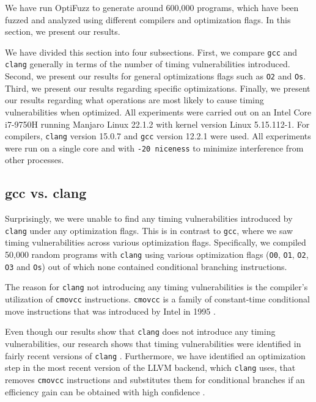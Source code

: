 We have run OptiFuzz to generate around 600,000 programs, which have been fuzzed and analyzed using different compilers and optimization flags.
In this section, we present our results.

We have divided this section into four subsections.
First, we compare \texttt{gcc} and \texttt{clang} generally in terms of the number of timing vulnerabilities introduced.
Second, we present our results for general optimizations flags such as \texttt{O2} and \texttt{Os}.
Third, we present our results regarding specific optimizations.
Finally, we present our results regarding what operations are most likely to cause timing vulnerabilities when optimized.
All experiments were carried out on an Intel Core i7-9750H running Manjaro Linux 22.1.2 with kernel version Linux 5.15.112-1. 
For compilers, \texttt{clang} version 15.0.7 and \texttt{gcc} version 12.2.1 were used.
All experiments were run on a single core and with \texttt{-20 niceness} to minimize interference from other processes.

\subsection{gcc vs. clang}
Surprisingly, we were unable to find any timing vulnerabilities introduced by \texttt{clang} under any optimization flags.
This is in contrast to \texttt{gcc}, where we saw timing vulnerabilities across various optimization flags.
Specifically, we compiled 50,000 random programs with \texttt{clang} using various optimization flags (\texttt{O0}, \texttt{O1}, \texttt{O2}, \texttt{O3} and \texttt{Os}) out of which none contained conditional branching instructions.

The reason for \texttt{clang} not introducing any timing vulnerabilities is the compiler's utilization of \texttt{cmovcc} instructions. 
\texttt{cmovcc} is a family of constant-time conditional move instructions \citep{cmov-is-constant-time} that was introduced by Intel in 1995 \citep{cmov-from-1995}. 

Even though our results show that \texttt{clang} does not introduce any timing vulnerabilities, our research shows that timing vulnerabilities were identified in fairly recent versions of \texttt{clang} \citep{fact,what-you-c}. 
Furthermore, we have identified an optimization step in the most recent version of the LLVM backend, which \texttt{clang} uses, that removes \texttt{cmovcc} instructions and substitutes them for conditional branches if an efficiency gain can be obtained with high confidence \citep{llvm-optimizing-away-cmov}.


